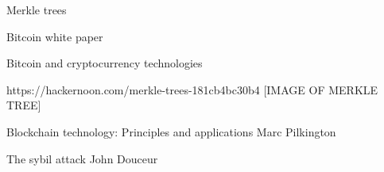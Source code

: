 \documentclass{l4proj}
\begin{document}





Merkle trees

Bitcoin white paper

Bitcoin and cryptocurrency technologies

https://hackernoon.com/merkle-trees-181cb4bc30b4
[IMAGE OF MERKLE TREE] 

Blockchain technology: Principles and applications Marc Pilkington

The sybil attack John Douceur
\end{document}
